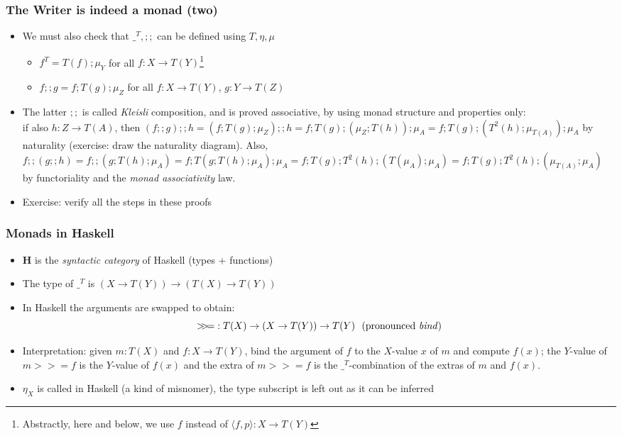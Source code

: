 \documentclass[handout]{beamer}
\newcommand{\bfsf}[1]{{\boldsymbol{#1}}}
\newcommand{\HH}{\bfsf{H}}
\newcommand{\Kp}[1]{{\langle #1 \rangle}}
\newcommand{\Kc}{;\!;}
\newcommand{\bind}{{>}\!\!{>}\!{=}}
\newcommand{\ttt}[1]{\text{\tt #1}}
\begin{document}
\frame
  {   
    \frametitle{The Writer is indeed a monad (two)}\label{Mon5:ExaMonadTwo}

 \begin{itemize}[<+->]
\item We must also check that $\_^T, \Kc$ can be defined using $T,\eta,\mu$
 \begin{itemize}
\item $f^T = T(f);\mu_Y$ for all $f: X\to T(Y)$\footnote{Abstractly, here and below,
we use $f$ instead of $\Kp{f,p}:X\to T(Y)$}
\item $f \Kc  g = f ;T(g);\mu_Z$ for all $f: X\to T(Y)$, $g: Y\to T(Z)$
 \end{itemize}
\item The latter $\Kc$ is called \emph{Kleisli} composition, and is proved
associative, by using monad structure and properties only:\\
if also $h: Z\to T(A)$, then
$(f \Kc g) \Kc h = (f ;T(g);\mu_Z) \Kc h = f ;T(g);(\mu_Z; T(h)) ; \mu_A =
f ;T(g);(T^2(h);\mu_{T(A)}) ; \mu_A$ by naturality (exercise: draw the naturality diagram). 
Also, $f \Kc (g \Kc h) = f \Kc (g;T(h);\mu_A) = f; T(g;T(h);\mu_A);\mu_A =
f; T(g);T^2(h);(T(\mu_A);\mu_A) = f; T(g);T^2(h);(\mu_{T(A)};\mu_A)$
by functoriality and the \emph{monad associativity} law.

\item Exercise: verify all the steps in these proofs
 \end{itemize}

 }

\frame
  {   
    \frametitle{Monads in Haskell}\label{Mon5:MonadHask}

 \begin{itemize}[<+->]
\item $\HH$ is the \emph{syntactic category} of Haskell (types + functions)
\item The type of $\_^T$ is $(X\to T(Y)) \to (T(X)\to T(Y))$
\item In Haskell the arguments are swapped to obtain:
$$\bind : T(X) \to (X\to T(Y)) \to T(Y)~~\text{(pronounced \emph{bind}})$$
\item Interpretation: given $m:T(X)$ and $f: X\to T(Y)$, %
bind the argument of $f$ to the $X$-value $x$ of $m$ and compute $f(x)$;
the $Y$-value of $m\bind f$ is the $Y$-value of $f(x)$ and
the extra of $m\bind f$ is the $\_^T$-combination of 
the extras of $m$ and $f(x)$.
\item $\eta_X$ is called \ttt{return} in Haskell (a kind of misnomer),
the type subscript is left out as it can be inferred


 \end{itemize}

 }
\end{document}
